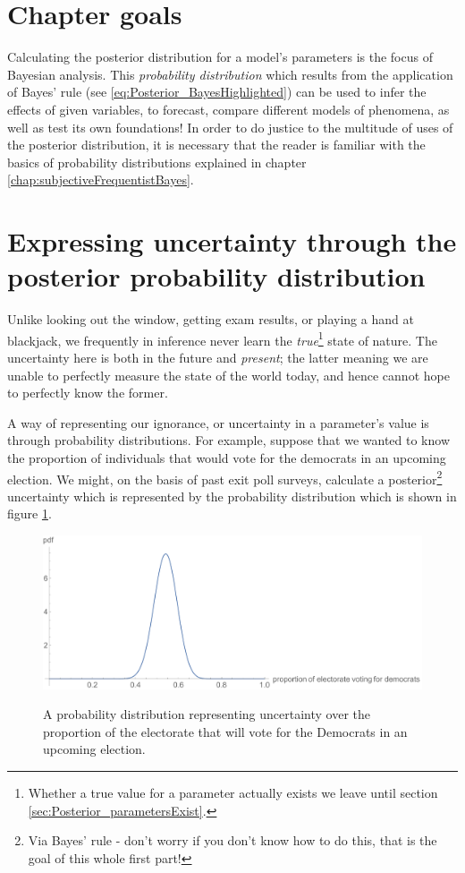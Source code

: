 \documentclass[11pt,fullpage]{book}
\begin{document}
\section{Chapter goals}
Calculating the posterior distribution for a model's parameters is the focus of Bayesian analysis. This \textit{probability distribution} which results from the application of Bayes' rule (see \ref{eq:Posterior_BayesHighlighted}) can be used to infer the effects of given variables, to forecast, compare different models of phenomena, as well as test its own foundations! In order to do justice to the multitude of uses of the posterior distribution, it is necessary that the reader is familiar with the basics of probability distributions explained in chapter \ref{chap:subjectiveFrequentistBayes}. 

\section{Expressing uncertainty through the posterior probability distribution}\label{sec:Posterior_parameterUncertainty}
Unlike looking out the window, getting exam results, or playing a hand at blackjack, we frequently in inference never learn the \textit{true}\footnote{Whether a true value for a parameter actually exists we leave until section \ref{sec:Posterior_parametersExist}.} state of nature. The uncertainty here is both in the future and \textit{present}; the latter meaning we are unable to perfectly measure the state of the world today, and hence cannot hope to perfectly know the former.

A way of representing our ignorance, or uncertainty in a parameter's value is through probability distributions. For example, suppose that we wanted to know the proportion of individuals that would vote for the democrats in an upcoming election. We might, on the basis of past exit poll surveys, calculate a posterior\footnote{Via Bayes' rule - don't worry if you don't know how to do this, that is the goal of this whole first part!} uncertainty which is represented by the probability distribution which is shown in figure \ref{fig:Posterior_electionProportion}. 

\begin{figure}
\centering
\scalebox{0.5} 
{\includegraphics{Posterior_electionProportion.pdf}}
\caption{A probability distribution representing uncertainty over the proportion of the electorate that will vote for the Democrats in an upcoming election.}\label{fig:Posterior_electionProportion}
\end{figure}
\end{document}
